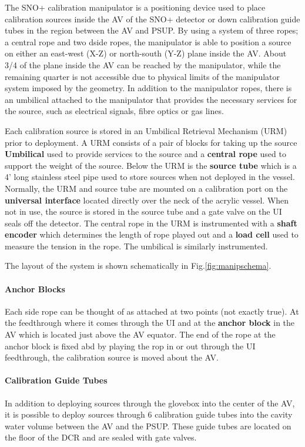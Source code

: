 

The SNO+ calibration manipulator is a positioning device used to place
calibration sources inside the AV of the SNO+ detector or down
calibration guide tubes in the region between the AV and PSUP. By
using a system of three ropes; a central rope and two dside ropes, the
manipulator is able to position a source on either an east-west (X-Z) or
north-south (Y-Z) plane inside the AV. About 3/4 of the plane inside
the AV can be reached by the manipulator, while the remaining quarter
is not accessible due to physical limits of the manipulator system
imposed by the geometry. In addition to the manipulator ropes, there
is an umbilical attached to the manipulator that provides the
necessary services for the source, such as electrical signals, fibre
optics or gas lines.

Each calibration source is stored in an Umbilical Retrieval Mechanism
(URM) prior to deployment. A URM consists of a pair of blocks for
taking up the source \textbf{Umbilical} used to provide services to
the source and a \textbf{central rope} used to support the weight of
the source. Below the URM is the \textbf{source tube} which is a 4'
long stainless steel pipe used to store sources when not deployed in
the vessel. Normally, the URM and source tube are mounted on a
calibration port on the \textbf{universal interface} located directly
over the neck of the acrylic vessel. When not in use, the source is
stored in the source tube and a gate valve on the UI seals off the
detector. The central rope in the URM is instrumented with a
\textbf{shaft encoder} which determines the length of rope played out
and a \textbf{load cell} used to measure the tension in the rope. The
umbilical is similarly instrumented.

The layout of the system is shown schematically in
Fig.\ref{fig:manipschema}.

\paragraph{Anchor Blocks}
Each side rope can be thought of as attached at two points (not
exactly true). At the feedthrough where it comes through the UI and at
the \textbf{anchor block} in the AV which is located just above the AV
equator. The end of the rope at the anchor block is fixed abd by
playing the rop in or out through the UI feedthrough, the calibration
source is moved about the AV.

\paragraph{Calibration Guide Tubes}
In addition to deploying sources through the glovebox into the center
of the AV, it is possible to deploy sources through 6 calibration
guide tubes into the cavity water volume between the AV and the
PSUP. These guide tubes are located on the floor of the DCR and are
sealed with gate valves.

